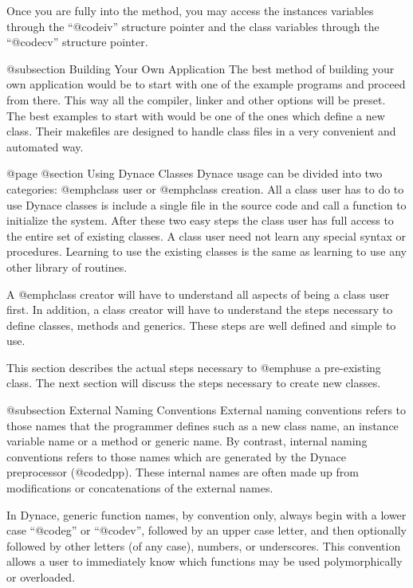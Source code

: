Once you are fully into the method, you may access the instances
variables through the ``@code{iv}'' structure pointer and the
class variables through the ``@code{cv}'' structure pointer.



@subsection Building Your Own Application
The best method of building your own application would be to start
with one of the example programs and proceed from there.  This way
all the compiler, linker and other options will be preset.  The best
examples to start with would be one of the ones which define a new
class.  Their makefiles are designed to handle class files in
a very convenient and automated way.


@page
@section Using Dynace Classes
Dynace usage can be divided into two categories: @emph{class user} or
@emph{class creation}.  All a class user has to do to use Dynace classes
is include a single file in the source code and call a function to
initialize the system.  After these two easy steps the class user has full
access to the entire set of existing classes.  A class user need not learn
any special syntax or procedures.  Learning to use the existing classes
is the same as learning to use any other library of routines.

A @emph{class creator} will have to understand all aspects of being a
class user first.  In addition, a class creator will have to understand
the steps necessary to define classes, methods and generics.  These
steps are well defined and simple to use.

This section describes the actual steps necessary to @emph{use} a
pre-existing class.  The next section will discuss the steps necessary
to create new classes.

@subsection External Naming Conventions
External naming conventions refers to those names that the programmer
defines such as a new class name, an instance variable name or a method
or generic name.  By contrast, internal naming conventions refers to
those names which are generated by the Dynace preprocessor (@code{dpp}).
These internal names are often made up from modifications or
concatenations of the external names.

In Dynace, generic function names, by convention only, always begin with
a lower case ``@code{g}'' or ``@code{v}'', followed by an upper case
letter, and then optionally followed by other letters (of any case),
numbers, or underscores.  This convention allows a user to immediately
know which functions may be used polymorphically or overloaded.

